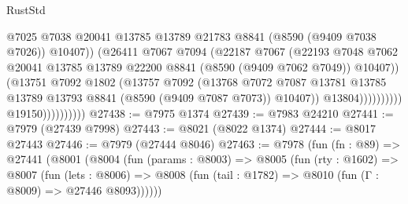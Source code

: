 \begin{lexlean}{RustStd}
\begin{coremodule}
                                            @7025
                                            @7038
                                            @20041
                                            @13785
                                            @13789
                                            @21783
                                            @8841
                                            (@8590 (@9409 @7038 @7026))
                                            @10407))
                                        (@26411
                                          @7067
                                          @7094
                                          (@22187
                                            @7067
                                            (@22193
                                              @7048
                                              @7062
                                              @20041
                                              @13785
                                              @13789
                                              @22200
                                              @8841
                                              (@8590 (@9409 @7062 @7049))
                                              @10407))
                                          (@13751
                                            @7092
                                            @1802
                                            (@13757
                                              @7092
                                              (@13768
                                                @7072
                                                @7087
                                                @13781
                                                @13785
                                                @13789
                                                @13793
                                                @8841
                                                (@8590 (@9409 @7087 @7073))
                                                @10407))
                                            @13804))))))))))
                        @19150))))))))))
@27438 := @7975 @1374
@27439 := @7983 @24210
@27441 := @7979 (@27439 @7998)
@27443 := @8021 (@8022 @1374)
@27444 := @8017 @27443
@27446 := @7979 (@27444 @8046)
@27463 := @7978
    (fun (fn : @89) =>
    @27441
      (@8001
        (@8004
          (fun (params : @8003) =>
          @8005
            (fun (rty : @1602) =>
            @8007
              (fun (lets : @8006) =>
              @8008 (fun (tail : @1782) => @8010 (fun (Γ : @8009) => @27446 @8093))))))

\end{coremodule}
\end{lexlean}
